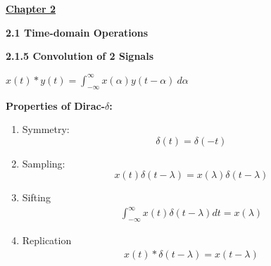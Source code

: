 \documentclass[landscape,a4paper]{extarticle}
\begin{document}
\begin{multicols*}{5}
    \textbf{\uline{Chapter 2}}

    \textbf{2.1 Time-domain Operations}








    \textbf{2.1.5 Convolution of 2 Signals}

    $x(t)*y(t)=\int_{-\infty}^{\infty}x(\alpha)y(t-\alpha)\ d\alpha$


    \textbf{Properties of Dirac-$\delta$: }
    \begin{enumerate}
        \item Symmetry:
        \[
            \delta(t)=\delta(-t) \tag{2.3}
        \]
        \item Sampling: 
        \[
            x(t)\delta(t-\lambda)=x(\lambda)\delta(t-\lambda) \tag{2.4}
        \]
        \item Sifting
        \begin{align*}
            \int_{-\infty}^{\infty} x(t)\delta(t-\lambda)dt=x(\lambda) \tag{2.5}
        \end{align*}
        \item Replication
        \begin{align*}
            x(t)*\delta(t-\lambda)=x(t-\lambda) \tag{2.6}
        \end{align*}
    \end{enumerate}


\end{multicols*}
\end{document}
